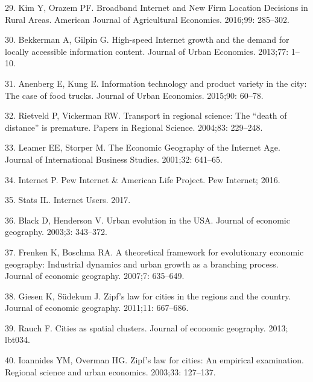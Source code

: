 \documentclass[10pt,letterpaper]{article}
\begin{document}
\leavevmode\hypertarget{ref-kim_broadband_2016}{}%
29. Kim Y, Orazem PF. Broadband Internet and New Firm Location Decisions
in Rural Areas. American Journal of Agricultural Economics. 2016;99:
285--302.

\leavevmode\hypertarget{ref-bekkerman_high-speed_2013}{}%
30. Bekkerman A, Gilpin G. High-speed Internet growth and the demand for
locally accessible information content. Journal of Urban Economics.
2013;77: 1--10.

\leavevmode\hypertarget{ref-anenberg_information_2015}{}%
31. Anenberg E, Kung E. Information technology and product variety in
the city: The case of food trucks. Journal of Urban Economics. 2015;90:
60--78.

\leavevmode\hypertarget{ref-rietveld_transport_2004}{}%
32. Rietveld P, Vickerman RW. Transport in regional science: The ``death
of distance'' is premature. Papers in Regional Science. 2004;83:
229--248.

\leavevmode\hypertarget{ref-edward_e_leamer_economic_2001}{}%
33. Leamer EE, Storper M. The Economic Geography of the Internet Age.
Journal of International Business Studies. 2001;32: 641--65.

\leavevmode\hypertarget{ref-pew_internet_pew_2016}{}%
34. Internet P. Pew Internet \& American Life Project. Pew Internet;
2016.

\leavevmode\hypertarget{ref-internet_live_stats_internet_2017}{}%
35. Stats IL. Internet Users. 2017.

\leavevmode\hypertarget{ref-black_urban_2003}{}%
36. Black D, Henderson V. Urban evolution in the USA. Journal of
economic geography. 2003;3: 343--372.

\leavevmode\hypertarget{ref-frenken_theoretical_2007}{}%
37. Frenken K, Boschma RA. A theoretical framework for evolutionary
economic geography: Industrial dynamics and urban growth as a branching
process. Journal of economic geography. 2007;7: 635--649.

\leavevmode\hypertarget{ref-giesen_zipfs_2011}{}%
38. Giesen K, Südekum J. Zipf's law for cities in the regions and the
country. Journal of economic geography. 2011;11: 667--686.

\leavevmode\hypertarget{ref-rauch_cities_2013}{}%
39. Rauch F. Cities as spatial clusters. Journal of economic geography.
2013; lbt034.

\leavevmode\hypertarget{ref-ioannides_zipfs_2003}{}%
40. Ioannides YM, Overman HG. Zipf's law for cities: An empirical
examination. Regional science and urban economics. 2003;33: 127--137.
\end{document}
